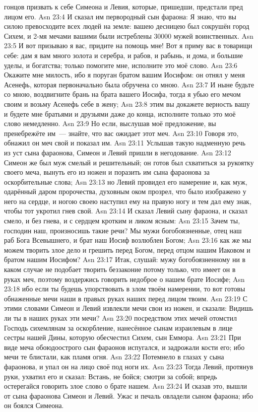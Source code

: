 гонцов призвать к себе Симеона и Левия, которые, пришедши, предстали
пред лицом его.
\vs Asn 23:4
И сказал им первородный сын
фараона: Я знаю, что вы силою превосходите всех людей на земле: вашею десницею
был сокрушён город Сихем, и 2-мя мечами вашими были истреблены 30000
мужей воинственных.
\vs Asn 23:5
И вот призываю я вас,
придите на помощь мне! Вот я приму вас в товарищи себе: дам я вам много золота
и серебра, и рабов, и рабынь, и дома, и большие уделы, и богатства;
только помогите мне, исполните это моё слово.
\vs Asn 23:6
Окажите мне милость, ибо я
поруган братом вашим Иосифом: он отнял у меня Асенефь, которая первоначально
была обручена со мною.
\vs Asn 23:7
И ныне будьте со мною,
воздвигните брань на брата вашего Иосифа, тогда я убью его мечом своим и возьму
Асенефь себе в жену;
\vs Asn 23:8
этим вы докажете верность
вашу и будете мне братьями и друзьями даже до конца, исполните только это моё
слово немедленно.
\vs Asn 23:9
Но если, выслушав моё
предложение, вы пренебрежёте им~--- знайте, что вас ожидает этот меч.
\vs Asn 23:10
Говоря это, обнажил он меч свой и показал им.
\vs Asn 23:11
Услышав такую надменную
речь из уст сына фараонова, Симеон и Левий пришли в негодование.
\vs Asn 23:12
Симеон же был муж смелый и
решительный; он готов был схватиться за рукоятку своего меча, вынуть его из
ножен и поразить им сына фараонова за оскорбительные слова;
\vs Asn 23:13
но Левий провидел его
намерение и, как муж, одарённый даром пророчества, духовным оком прозрел, что
было изображено у него на сердце, и ногою своею наступил ему на правую ногу и
тем дал ему знак, чтобы тот укротил гнев свой.
\vs Asn 23:14
И сказал Левий сыну
фараона, и сказал смело, и без гнева, и с сердцем кротким и ликом ясным:
\vs Asn 23:15
Зачем ты, господин наш,
произносишь такие речи? Мы мужи богобоязненные, отец наш раб Бога
Всевышнего, и брат наш Иосиф возлюблен Богом;
\vs Asn 23:16
как же мы можем творить
злое дело и грешить перед Богом, перед отцом нашим Иаковом и братом нашим
Иосифом?
\vs Asn 23:17
Итак, слушай: мужу
богобоязненному ни в каком случае не подобает творить беззаконие потому только,
что имеет он в руках меч, поэтому воздержись говорить недоброе о нашем брате
Иосифе;
\vs Asn 23:18
ибо если ты будешь
упорствовать в злом твоём намерении, то вот готовы обнаженные мечи наши в
правых руках наших перед лицом твоим.
\vs Asn 23:19
С этими словами Симеон и
Левий извлекли мечи свои из ножен, и сказали: Видишь ли ты в наших руках эти
мечи?
\vs Asn 23:20
посредством этих мечей
отомстил Господь сихемлянам за оскорбление, нанесённое сынам израилевым в лице
сестры нашей Дины, которую обесчестил Сихем, сын Еммора.
\vs Asn 23:21
При виде меча обоюдоострого
сын фараонов испугался, и задрожали кости его; ибо мечи те блистали, как пламя
огня.
\vs Asn 23:22
Потемнело в глазах у сына
фараонова, и упал он на лицо своё под ноги их.
\vs Asn 23:23
Тогда Левий, протянув руки,
ухватил его и сказал: Встань, не бойся; смотри за собой; впредь остерегайся
говорить злое слово о брате нашем.
\vs Asn 23:24
И сказав это, вышли от сына
фараонова Симеон и Левий. Ужас и печаль овладели сыном фараона; ибо он боялся
Симеона.

